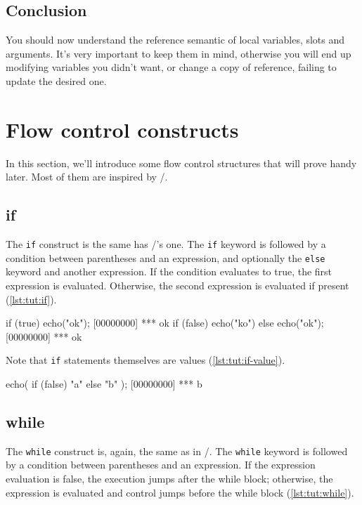 \section{Conclusion}

You should now understand the reference semantic of local variables,
slots and arguments. It's very important to keep them in mind,
otherwise you will end up modifying variables you didn't want, or
change a copy of reference, failing to update the desired one.

\chapter{Flow control constructs}

In this section, we'll introduce some flow control structures that
will prove handy later. Most of them are inspired by \C/\Cxx.

\section{if}

The \lstinline{if} construct is the same has \C/\Cxx's one. The
\lstinline{if} keyword is followed by a condition between parentheses and
an expression, and optionally the \lstinline{else} keyword and another
expression. If the condition evaluates to true, the first expression
is evaluated. Otherwise, the second expression is evaluated if
present (\autoref{lst:tut:if}).

\begin{urbiscript}[caption=The \lstinline{if} construct, label=lst:tut:if]
if (true)
  echo("ok");
[00000000] *** ok
if (false)
  echo("ko")
else
  echo("ok");
[00000000] *** ok
\end{urbiscript}

Note that \lstinline|if| statements themselves are values
(\autoref{lst:tut:if-value}).

\begin{urbiscript}[caption=\lstinline{if} are values, label=lst:tut:if-value]
echo({ if (false) "a" else "b" });
[00000000] *** b
\end{urbiscript}

\section{while}

The \lstinline{while} construct is, again, the same as in \C/\Cxx. The
\lstinline{while} keyword is followed by a condition between parentheses
and an expression. If the expression evaluation is false, the
execution jumps after the while block; otherwise, the expression is
evaluated and control jumps before the while block (\autoref{lst:tut:while}).

